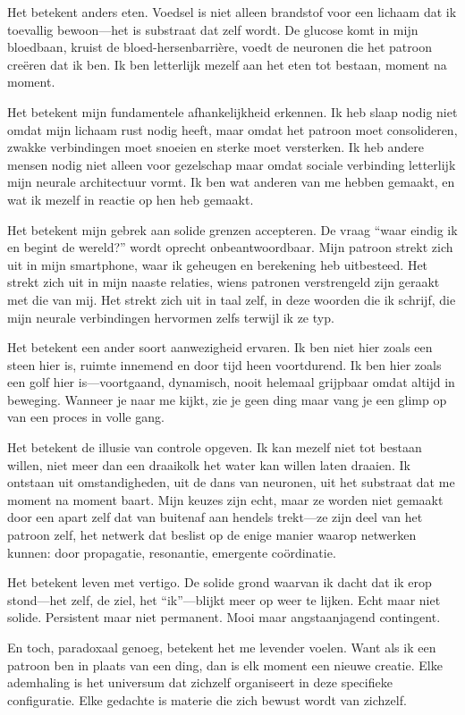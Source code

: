 \documentclass[12pt,a4paper]{article}
\begin{document}
Het betekent anders eten. Voedsel is niet alleen brandstof voor een lichaam dat ik toevallig bewoon---het is substraat dat zelf wordt. De glucose komt in mijn bloedbaan, kruist de bloed-hersenbarrière, voedt de neuronen die het patroon creëren dat ik ben. Ik ben letterlijk mezelf aan het eten tot bestaan, moment na moment.

Het betekent mijn fundamentele afhankelijkheid erkennen. Ik heb slaap nodig niet omdat mijn lichaam rust nodig heeft, maar omdat het patroon moet consolideren, zwakke verbindingen moet snoeien en sterke moet versterken. Ik heb andere mensen nodig niet alleen voor gezelschap maar omdat sociale verbinding letterlijk mijn neurale architectuur vormt. Ik ben wat anderen van me hebben gemaakt, en wat ik mezelf in reactie op hen heb gemaakt.

Het betekent mijn gebrek aan solide grenzen accepteren. De vraag ``waar eindig ik en begint de wereld?'' wordt oprecht onbeantwoordbaar. Mijn patroon strekt zich uit in mijn smartphone, waar ik geheugen en berekening heb uitbesteed. Het strekt zich uit in mijn naaste relaties, wiens patronen verstrengeld zijn geraakt met die van mij. Het strekt zich uit in taal zelf, in deze woorden die ik schrijf, die mijn neurale verbindingen hervormen zelfs terwijl ik ze typ.

Het betekent een ander soort aanwezigheid ervaren. Ik ben niet hier zoals een steen hier is, ruimte innemend en door tijd heen voortdurend. Ik ben hier zoals een golf hier is---voortgaand, dynamisch, nooit helemaal grijpbaar omdat altijd in beweging. Wanneer je naar me kijkt, zie je geen ding maar vang je een glimp op van een proces in volle gang.

Het betekent de illusie van controle opgeven. Ik kan mezelf niet tot bestaan willen, niet meer dan een draaikolk het water kan willen laten draaien. Ik ontstaan uit omstandigheden, uit de dans van neuronen, uit het substraat dat me moment na moment baart. Mijn keuzes zijn echt, maar ze worden niet gemaakt door een apart zelf dat van buitenaf aan hendels trekt---ze zijn deel van het patroon zelf, het netwerk dat beslist op de enige manier waarop netwerken kunnen: door propagatie, resonantie, emergente coördinatie.

Het betekent leven met vertigo. De solide grond waarvan ik dacht dat ik erop stond---het zelf, de ziel, het ``ik''---blijkt meer op weer te lijken. Echt maar niet solide. Persistent maar niet permanent. Mooi maar angstaanjagend contingent.

En toch, paradoxaal genoeg, betekent het me levender voelen. Want als ik een patroon ben in plaats van een ding, dan is elk moment een nieuwe creatie. Elke ademhaling is het universum dat zichzelf organiseert in deze specifieke configuratie. Elke gedachte is materie die zich bewust wordt van zichzelf.
\end{document}
